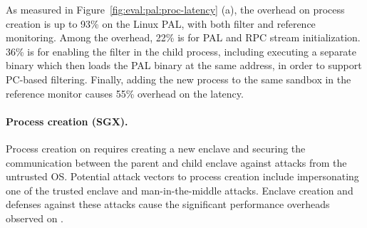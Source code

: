 As measured in
Figure~\ref{fig:eval:pal:proc-latency} (a),
the overhead on process creation
is up to 93\% on the Linux PAL,
with both \seccomp{} filter and reference monitoring.
Among the overhead,
22\% is for PAL and RPC stream initialization.
36\% is for enabling the \seccomp{} filter
in the child process,
including executing a separate binary
which then loads the PAL binary at the same address,
in order to
support PC-based filtering.
Finally,
adding the new process to the same sandbox
in the reference monitor
causes 55\% overhead on the latency.










\paragraph{Process creation (SGX).}
Process creation
on \sgx{} requires creating a new enclave
and securing the communication between the parent and child enclave against attacks from the untrusted OS.
Potential attack vectors to process creation
include impersonating one of the trusted enclave and man-in-the-middle attacks.
Enclave creation and
defenses against these attacks
cause the significant performance overheads
observed on \thehostabi{}.



